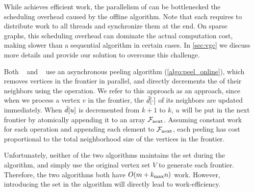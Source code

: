 While \Julienne{} achieves efficient work, the parallelism of \Julienne{} can be bottlenecked the scheduling overhead caused by the offline algorithm.
Note that each \subround{} requires to distribute work to all threads and synchronize them at the end. 
On sparse graphs, this scheduling overhead can dominate the actual computation cost, 
making \Julienne{} slower than a sequential algorithm in certain cases. 
In \cref{sec:vgc} we discuss more details and provide our solution to overcome this challenge. 

Both \Park{}~\cite{dasari2014park} and \pkc{}~\cite{kabir2017parallel} use an asynchronous peeling algorithm (\cref{algo:peel_online}), which
removes vertices in the frontier in parallel, 
and directly decrements the  of their neighbors using the \atomdec{} operation. 
We refer to this approach as an  approach, 
since when we process a vertex $v$ in the frontier, the  $\tilde{d}[\cdot]$ of its neighbors are updated immediately. 
When $\tilde{d}[u]$ is decremented from $k+1$ to $k$, 
$u$ will be put in the next frontier by atomically appending it to an array $\mathcal{F}_{\text{next}}$. 
Assuming constant work for each \atomdec{} operation and appending each element to $\mathcal{F}_{\text{next}}$, 
each peeling \subround has cost proportional to the total neighborhood size of the vertices in the frontier. 

Unfortunately, neither of the two algorithms maintains the \alive{} set during the algorithm, 
and simply use the original vertex set $V$ to generate each frontier. Therefore, the two algorithms both have $O(m+{k_{\max}} n)$ work. 
However, introducing the \alive{} set in the algorithm will directly lead to work-efficiency. 



